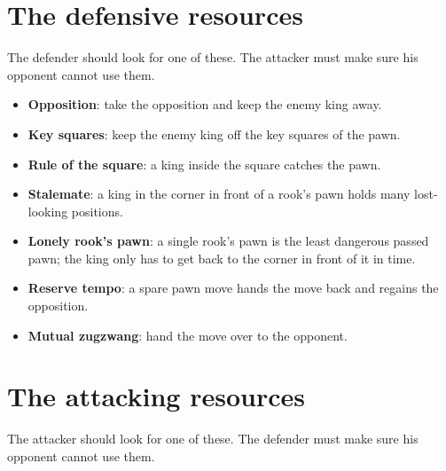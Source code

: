
\section*{The defensive resources}
The defender should look for one of these. The attacker must make sure his opponent cannot use them.

\begin{itemize}
\item \textbf{Opposition}: take the opposition and keep the enemy king away.

\item \textbf{Key squares}: keep the enemy king off the key squares of the pawn.

\item \textbf{Rule of the square}: a king inside the square catches the pawn.

\item \textbf{Stalemate}: a king in the corner in front of a rook's pawn holds many lost-looking positions.

\item \textbf{Lonely rook's pawn}: a single rook's pawn is the least dangerous passed pawn; the king only has to get back to the corner in front of it in time.

\item \textbf{Reserve tempo}: a spare pawn move hands the move back and regains the opposition.

\item \textbf{Mutual zugzwang}: hand the move over to the opponent.
\end{itemize}

\section*{The attacking resources}
The attacker should look for one of these. The defender must make sure his opponent cannot use them.

